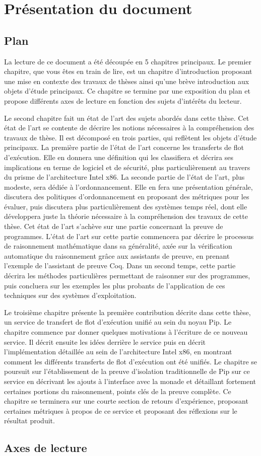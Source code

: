 \section{Présentation du document}

\subsection{Plan}

La lecture de ce document a été découpée en 5 chapitres principaux. Le premier chapitre, que vous êtes en train de lire, est un chapitre d'introduction proposant une mise en contexte des travaux de thèses ainsi qu'une brève introduction aux objets d'étude principaux. Ce chapitre se termine par une exposition du plan et propose différents axes de lecture en fonction des sujets d'intérêts du lecteur.

Le second chapitre fait un état de l'art des sujets abordés dans cette thèse. Cet état de l'art se contente de décrire les notions nécessaires à la compréhension des travaux de thèse. Il est décomposé en trois parties, qui reflètent les objets d'étude principaux. La première partie de l'état de l'art concerne les transferts de flot d'exécution. Elle en donnera une définition qui les classifiera et décrira ses implications en terme de logiciel et de sécurité, plus particulièrement au travers du prisme de l'architecture Intel x86. La seconde partie de l'état de l'art, plus modeste, sera dédiée à l'ordonnancement. Elle en fera une présentation générale, discutera des politiques d'ordonnancement en proposant des métriques pour les évaluer, puis discutera plus particulièrement des systèmes temps réel, dont elle développera juste la théorie nécessaire à la compréhension des travaux de cette thèse. Cet état de l'art s'achève sur une partie concernant la preuve de programmes. L'état de l'art sur cette partie commencera par décrire le processus de raisonnement mathématique dans sa généralité, axée sur la vérification automatique du raisonnement grâce aux assistants de preuve, en prenant l'exemple de l'assistant de preuve Coq. Dans un second temps, cette partie décrira les méthodes particulières permettant de raisonner sur des programmes, puis concluera sur les exemples les plus probants de l'application de ces techniques sur des systèmes d'exploitation.

Le troisième chapitre présente la première contribution décrite dans cette thèse, un service de transfert de flot d'exécution unifié au sein du noyau Pip. Le chapitre commence par donner quelques motivations à l'écriture de ce nouveau service. Il décrit ensuite les idées derrière le service puis en décrit l'implémentation détaillée au sein de l'architecture Intel x86, en montrant comment les différents transferts de flot d'exécution ont été unifiés. Le chapitre se poursuit sur l'établissement de la preuve d'isolation traditionnelle de Pip sur ce service en décrivant les ajouts à l'interface avec la monade et détaillant fortement certaines portions du raisonnement, points clés de la preuve complète. Ce chapitre se terminera sur une courte section de retours d'expérience, proposant certaines métriques à propos de ce service et proposant des réflexions sur le résultat produit. 


\subsection{Axes de lecture}

